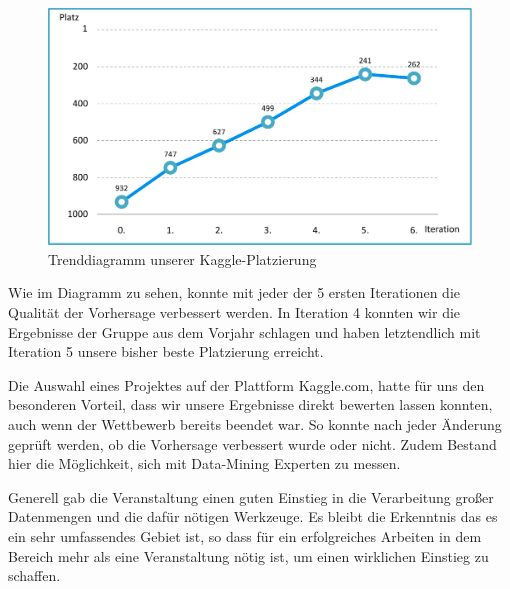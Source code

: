 \begin{figure}[H]
\centering
\includegraphics[width=0.85\linewidth]{Bilder/Trenddiagramm_Platzierungen}
\caption{Trenddiagramm unserer Kaggle-Platzierung}
\label{fig:Trenddiagramm_Platzierungen}
\end{figure}

Wie im Diagramm zu sehen, konnte mit jeder der 5 ersten Iterationen die Qualität der Vorhersage verbessert werden. In Iteration 4 konnten wir die Ergebnisse der Gruppe aus dem Vorjahr schlagen und haben letztendlich mit Iteration 5 unsere bisher beste Platzierung erreicht.

Die Auswahl eines Projektes auf der Plattform Kaggle.com, hatte für uns den besonderen Vorteil, dass wir unsere Ergebnisse direkt bewerten lassen konnten, auch wenn der Wettbewerb bereits beendet war. So konnte nach jeder Änderung geprüft werden, ob die Vorhersage verbessert wurde oder nicht. Zudem Bestand hier die Möglichkeit, sich mit Data-Mining Experten zu messen.

Generell gab die Veranstaltung einen guten Einstieg in die Verarbeitung großer Datenmengen und die dafür nötigen Werkzeuge. Es bleibt die Erkenntnis das es ein sehr umfassendes Gebiet ist, so dass für ein erfolgreiches Arbeiten in dem Bereich mehr als eine Veranstaltung nötig ist, um einen wirklichen Einstieg zu schaffen.
